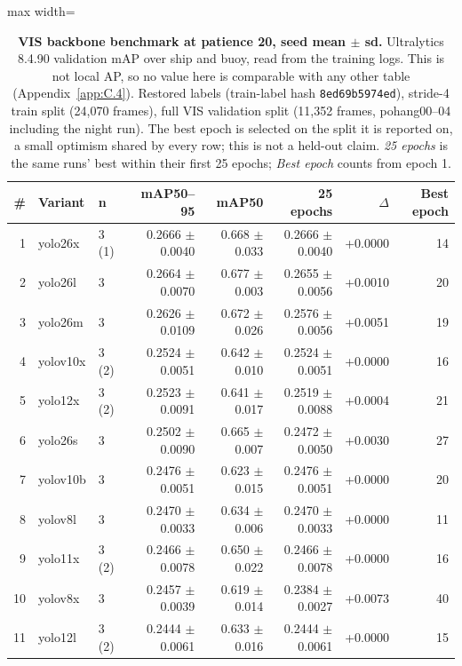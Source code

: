 \documentclass[10pt]{article}
\begin{document}
\begin{table}[htbp]
\centering
\footnotesize
\caption{\textbf{VIS backbone benchmark at patience 20, seed mean $\pm$ sd.} Ultralytics 8.4.90 validation mAP over ship and buoy, read from the training logs. This is not local AP, so no value here is comparable with any other table (Appendix~\ref{app:C.4}). Restored labels (train-label hash \texttt{8ed69b5974ed}), stride-4 train split (24,070 frames), full VIS validation split (11,352 frames, pohang00--04 including the night run). The best epoch is selected on the split it is reported on, a small optimism shared by every row; this is not a held-out claim. \emph{25 epochs} is the same runs' best within their first 25 epochs; \emph{Best epoch} counts from epoch 1.}
\label{tab:18}
\setlength{\tabcolsep}{3pt}
\begin{adjustbox}{max width=\linewidth}
\begin{tabular}{rllrrrrr}
\toprule
\# & Variant & n & mAP50--95 & mAP50 & 25 epochs & $\Delta$ & Best epoch \\
\midrule
1 & yolo26x & 3 (1\textdagger{}) & 0.2666 $\pm$ 0.0040 & 0.668 $\pm$ 0.033 & 0.2666 $\pm$ 0.0040 & +0.0000 & 14 \\
2 & yolo26l & 3 & 0.2664 $\pm$ 0.0070 & 0.677 $\pm$ 0.003 & 0.2655 $\pm$ 0.0056 & +0.0010 & 20 \\
3 & yolo26m & 3 & 0.2626 $\pm$ 0.0109 & 0.672 $\pm$ 0.026 & 0.2576 $\pm$ 0.0056 & +0.0051 & 19 \\
4 & yolov10x & 3 (2\textdagger{}) & 0.2524 $\pm$ 0.0051 & 0.642 $\pm$ 0.010 & 0.2524 $\pm$ 0.0051 & +0.0000 & 16 \\
5 & yolo12x & 3 (2\textdagger{}) & 0.2523 $\pm$ 0.0091 & 0.641 $\pm$ 0.017 & 0.2519 $\pm$ 0.0088 & +0.0004 & 21 \\
6 & yolo26s & 3 & 0.2502 $\pm$ 0.0090 & 0.665 $\pm$ 0.007 & 0.2472 $\pm$ 0.0050 & +0.0030 & 27 \\
7 & yolov10b & 3 & 0.2476 $\pm$ 0.0051 & 0.623 $\pm$ 0.015 & 0.2476 $\pm$ 0.0051 & +0.0000 & 20 \\
8 & yolov8l & 3 & 0.2470 $\pm$ 0.0033 & 0.634 $\pm$ 0.006 & 0.2470 $\pm$ 0.0033 & +0.0000 & 11 \\
9 & yolo11x & 3 (2\textdagger{}) & 0.2466 $\pm$ 0.0078 & 0.650 $\pm$ 0.022 & 0.2466 $\pm$ 0.0078 & +0.0000 & 16 \\
10 & yolov8x & 3 & 0.2457 $\pm$ 0.0039 & 0.619 $\pm$ 0.014 & 0.2384 $\pm$ 0.0027 & +0.0073 & 40 \\
11 & yolo12l & 3 (2\textdagger{}) & 0.2444 $\pm$ 0.0061 & 0.633 $\pm$ 0.016 & 0.2444 $\pm$ 0.0061 & +0.0000 & 15 \\

\end{tabular}
\end{adjustbox}
\end{table}
\end{document}
